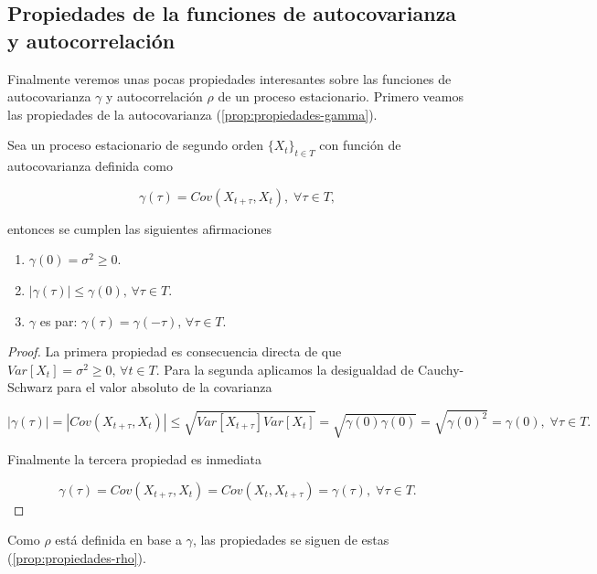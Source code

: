 \subsection{Propiedades de la funciones de autocovarianza y autocorrelación}

Finalmente veremos unas pocas propiedades interesantes sobre las funciones de autocovarianza $\gamma$ y autocorrelación $\rho$ de un proceso estacionario. Primero veamos las propiedades de la autocovarianza (\autoref{prop:propiedades-gamma}).

\begin{proposicion}
  Sea un proceso estacionario de segundo orden $\{X_t\}_{t \in T}$ con función de autocovarianza definida como

  $$\gamma(\tau) = Cov(X_{t + \tau}, X_t), \; \forall \tau \in T,$$

  entonces se cumplen las siguientes afirmaciones

  \begin{enumerate}
    \item $\gamma(0) = \sigma^2 \geq 0$.
    \item $|\gamma(\tau)| \leq \gamma(0), \, \forall \tau \in T$.
    \item $\gamma$ es par: $\gamma(\tau) = \gamma(-\tau), \, \forall \tau \in T$.
  \end{enumerate}
  \label{prop:propiedades-gamma}
\end{proposicion}

\begin{proof}
  La primera propiedad es consecuencia directa de que $Var[X_t] = \sigma^2 \geq 0, \, \forall t \in T$. Para la segunda aplicamos la desigualdad de Cauchy-Schwarz para el valor absoluto de la covarianza

    $$|\gamma(\tau)| = |Cov(X_{t+\tau}, X_t)| \leq \sqrt{Var[X_{t+\tau}]Var[X_t]} = \sqrt{\gamma(0)\gamma(0)} = \sqrt{\gamma(0)^2} = \gamma(0), \; \forall \tau \in T.$$

  Finalmente la tercera propiedad es inmediata

  $$\gamma(\tau) = Cov(X_{t + \tau}, X_t) = Cov(X_t, X_{t + \tau}) = \gamma(\tau), \; \forall \tau \in T.$$
\end{proof}

Como $\rho$ está definida en base a $\gamma$, las propiedades se siguen de estas (\autoref{prop:propiedades-rho}).

